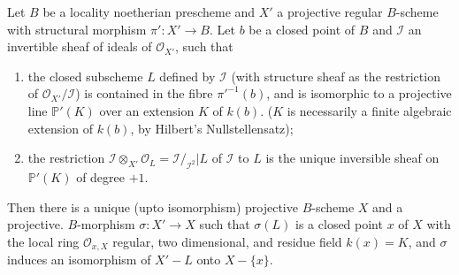 \begin{theorem*}[(Castelnuovo)]%
  Let $B$ be a locality noetherian prescheme and $X'$ a projective
  regular $B$-scheme with structural morphism $\pi' : X' \rightarrow
  B$. Let $b$ be a closed point of $B$ and $\mathscr{I}$ an invertible
  sheaf of ideals of $\mathscr{O}_{X'}$, such that 
  \begin{enumerate}[\rm (i)]
  \item the closed subscheme $L$ defined by $\mathscr{I}$ (with
    structure sheaf as the restriction of
    $\mathscr{O}_{X'}/\mathscr{I}$) is contained in the fibre
    $\pi'^{-1}(b)$, and is isomorphic to a projective line
    $\mathbb{P'}(K)$ over an extension $K$ of $k(b)$. ($K$ is
    necessarily a finite algebraic extension of $k(b)$, by Hilbert's
    Nullstellensatz); 

  \item the restriction $\mathscr{I}
    \otimes_{X'}\mathscr{O}_L=\mathscr{I}/_{\mathscr{I}^2} |L$ of
    $\mathscr{I}$ to $L$ is the unique inversible sheaf on
    $\mathbb{P}'(K)$ of degree $ + 1$. 
  \end{enumerate}
\end{theorem*}

Then there is a unique (upto isomorphism) projective $B$-scheme $X$ and
a projective. $B$-morphism $\sigma : X' \rightarrow X$ such that
$\sigma (L)$ is a closed point $x$ of $X$ with the local ring
$\mathscr{O}_{x,X}$ regular, two dimensional, and residue field
$k(x)=K$, and $\sigma$ induces an isomorphism of $X'-L$ onto $X-
\{x\}$. 

